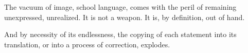 

﻿The vacuum of image, school language, comes with the peril of
remaining unexpressed, unrealized.  It is not a weapon.  It is, by
definition, out of hand.

And by necessity of its endlessness, the copying of each statement
into its translation, or into a process of correction, explodes.

\bye

